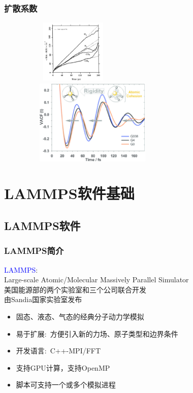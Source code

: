 \frame
{
	\frametitle{扩散系数}
\begin{figure}[h!]
\centering
\vspace*{-0.2in}
\includegraphics[height=1.2in,width=2.0in,viewport=0 0 350 300,clip]{Figures/MSD_O2-N2-CO2-CH4.png}\\
\includegraphics[height=1.6in,width=2.8in,viewport=0 0 230 160,clip]{Figures/The-velocity-autocorrelation-function-VACF-of-the-Al-atoms-showing-the-increase-of-rigidity of the local Al-coordination-for-G3-G4-and-G338-glasses.png}
\label{MSD-VACF}
\end{figure}
}

\section{\rm{LAMMPS}软件基础}
\subsection{\rm{LAMMPS}软件}
\frame
{
	\frametitle{\textrm{LAMMPS}简介}
	\textcolor{blue}{\textrm{LAMMPS}}:\\
	\textrm{Large-scale Atomic/Molecular Massively Parallel Simulator}\\
	美国能源部的两个实验室和三个公司联合开发\\
	由\textrm{Sandia}国家实验室发布
	\begin{itemize}
			\setlength{\itemsep}{10pt}
		\item 固态、液态、气态的经典分子动力学模拟
		\item 易于扩展:~方便引入新的力场、原子类型和边界条件
		\item 开发语言:~\textrm{C++-MPI/FFT}
		\item 支持\textrm{GPU}计算，支持\textrm{OpenMP}
		\item 脚本可支持一个或多个模拟进程
	\end{itemize}
}

